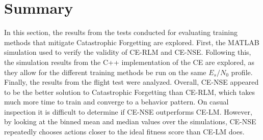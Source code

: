 \clearpage

\section{Summary}
\par In this section, the results from the tests conducted for evaluating training methods that mitigate Catastrophic Forgetting are explored. First, the MATLAB simulation used to verify the validity of CE-RLM and CE-NSE. Following this, the simulation results from the C++ implementation of the CE are explored, as they allow for the different training methods be run on the same $E_s/N_0$ profile. Finally, the results from the flight test were analyzed. Overall, CE-NSE appeared to be the better solution to Catastrophic Forgetting than CE-RLM, which takes much more time to train and converge to a behavior pattern. On casual inspection it is difficult to determine if CE-NSE outperforms CE-LM. However, by looking at the binned mean and median values over the simulations, CE-NSE repeatedly chooses actions closer to the ideal fitness score than CE-LM does.
